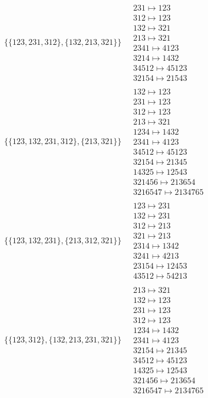 \begin{scriptsize}
\begin{align}
\begin{matrix}
\end{matrix}
\\
\{\{123, 231, 312\}, \{132, 213, 321\}\}
\ 
&
\begin{matrix}
231 \mapsto 123\\312 \mapsto 123\\132 \mapsto 321\\213 \mapsto 321\\2341 \mapsto 4123\\3214 \mapsto 1432\\34512 \mapsto 45123\\32154 \mapsto 21543
\end{matrix}
\\
\{\{123, 132, 231, 312\}, \{213, 321\}\}
\ 
&
\begin{matrix}
132 \mapsto 123\\231 \mapsto 123\\312 \mapsto 123\\213 \mapsto 321\\1234 \mapsto 1432\\2341 \mapsto 4123\\34512 \mapsto 45123\\32154 \mapsto 21345\\14325 \mapsto 12543\\321456 \mapsto 213654\\3216547 \mapsto 2134765
\end{matrix}
\\
\{\{123, 132, 231\}, \{213, 312, 321\}\}
\ 
&
\begin{matrix}
123 \mapsto 231\\132 \mapsto 231\\312 \mapsto 213\\321 \mapsto 213\\2314 \mapsto 1342\\3241 \mapsto 4213\\23154 \mapsto 12453\\43512 \mapsto 54213
\end{matrix}
\\
\{\{123, 312\}, \{132, 213, 231, 321\}\}
\ 
&
\begin{matrix}
213 \mapsto 321\\132 \mapsto 123\\231 \mapsto 123\\312 \mapsto 123\\1234 \mapsto 1432\\2341 \mapsto 4123\\32154 \mapsto 21345\\34512 \mapsto 45123\\14325 \mapsto 12543\\321456 \mapsto 213654\\3216547 \mapsto 2134765

\end{matrix}
\end{align}
\end{scriptsize}
